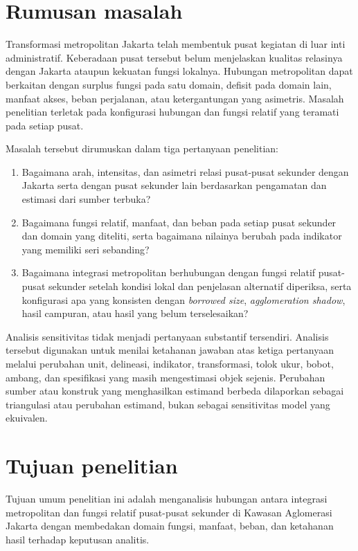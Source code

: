 \documentclass[11pt,a4paper,oneside,openany,indonesian]{report}
\begin{document}
\section{Rumusan masalah}

Transformasi metropolitan Jakarta telah membentuk pusat kegiatan di luar inti administratif. Keberadaan pusat tersebut belum menjelaskan kualitas relasinya dengan Jakarta ataupun kekuatan fungsi lokalnya. Hubungan metropolitan dapat berkaitan dengan surplus fungsi pada satu domain, defisit pada domain lain, manfaat akses, beban perjalanan, atau ketergantungan yang asimetris. Masalah penelitian terletak pada konfigurasi hubungan dan fungsi relatif yang teramati pada setiap pusat.

Masalah tersebut dirumuskan dalam tiga pertanyaan penelitian:

\begin{enumerate}
  \item Bagaimana arah, intensitas, dan asimetri relasi pusat-pusat sekunder dengan Jakarta serta dengan pusat sekunder lain berdasarkan pengamatan dan estimasi dari sumber terbuka?
  \item Bagaimana fungsi relatif, manfaat, dan beban pada setiap pusat sekunder dan domain yang diteliti, serta bagaimana nilainya berubah pada indikator yang memiliki seri sebanding?
  \item Bagaimana integrasi metropolitan berhubungan dengan fungsi relatif pusat-pusat sekunder setelah kondisi lokal dan penjelasan alternatif diperiksa, serta konfigurasi apa yang konsisten dengan \textit{borrowed size}, \textit{agglomeration shadow}, hasil campuran, atau hasil yang belum terselesaikan?
\end{enumerate}

Analisis sensitivitas tidak menjadi pertanyaan substantif tersendiri. Analisis tersebut digunakan untuk menilai ketahanan jawaban atas ketiga pertanyaan melalui perubahan unit, delineasi, indikator, transformasi, tolok ukur, bobot, ambang, dan spesifikasi yang masih mengestimasi objek sejenis. Perubahan sumber atau konstruk yang menghasilkan estimand berbeda dilaporkan sebagai triangulasi atau perubahan estimand, bukan sebagai sensitivitas model yang ekuivalen.

\section{Tujuan penelitian}

Tujuan umum penelitian ini adalah menganalisis hubungan antara integrasi metropolitan dan fungsi relatif pusat-pusat sekunder di Kawasan Aglomerasi Jakarta dengan membedakan domain fungsi, manfaat, beban, dan ketahanan hasil terhadap keputusan analitis.
\end{document}
